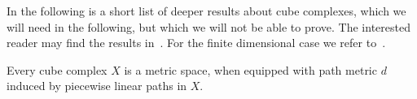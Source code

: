 

In the following is a short list of deeper results about cube complexes, which we will need in the following, but which we will not be able to prove. The interested reader may find the results in~\cite[Appendices A, B]{MR3029427}. For the finite dimensional case we refer to~\cite[Sec. I.7, II.5]{MR1744486}.

\begin{thm}[{\cite[I.7.10]{MR1744486}}]
  Every cube complex \(X\) is a metric space, when equipped with path metric \(d\) induced by piecewise linear paths in \(X\).
\end{thm}


